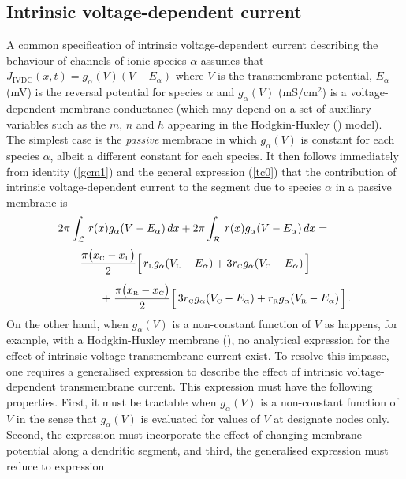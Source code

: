 \subsection{Intrinsic voltage-dependent current}
A common specification of intrinsic voltage-dependent current
describing the behaviour of channels of ionic species $\alpha$
assumes that $J_\mathrm{IVDC}(x,t)=g_\alpha(V)(V-E_\alpha)$ where
$V$ is the transmembrane potential, $E_\alpha$ (mV) is the
reversal potential for species $\alpha$ and $g_\alpha(V)$
(mS/cm$^2$) is a voltage-dependent membrane conductance (which may
depend on a set of auxiliary variables such as the $m$, $n$ and
$h$ appearing in the Hodgkin-Huxley (\cite{Hodgkin52}) model). The
simplest case is the \emph{passive} membrane in which
$g_\alpha(V)$ is constant for each species $\alpha$, albeit a
different constant for each species. It then follows immediately
from identity (\ref{gcm1}) and the general expression (\ref{tc0})
that the contribution of intrinsic voltage-dependent current to
the segment due to species $\alpha$ in a passive membrane is
\begin{equation}\label{gcm3}
\begin{array}{l}
\displaystyle2\pi\int_\mathcal{L}\, r(x) g_\alpha(V-E_\alpha)\,dx
+2\pi\int_\mathcal{R}\, r(x) g_\alpha(V-E_\alpha)\,dx = \\[12pt]
\qquad\displaystyle\frac{\pi\big(x_{\mbox{\tiny C}}-x_{\mbox{\tiny L}}\big)}{2}
\Big[\,r_{\mbox{\tiny L}} g_\alpha(V_{\mbox{\tiny L}}-E_\alpha)
+3r_{\mbox{\tiny C}} g_\alpha(V_{\mbox{\tiny C}}-E_\alpha)\,\Big]\\[12pt]
\qquad\qquad\displaystyle+\;\frac{\pi\big(x_{\mbox{\tiny R}}-x_{\mbox{\tiny C}}\big)}{2}
\Big[\,3r_{\mbox{\tiny C}} g_\alpha(V_{\mbox{\tiny C}}-E_\alpha)
+r_{\mbox{\tiny R}} g_\alpha(V_{\mbox{\tiny R}}-E_\alpha)\,\Big]\,.
\end{array}
\end{equation}
On the other hand, when $g_\alpha(V)$ is a non-constant function
of $V$ as happens, for example, with a Hodgkin-Huxley membrane
(\cite{Hodgkin52}), no analytical expression for the effect of
intrinsic voltage transmembrane current exist. To resolve this
impasse, one requires a generalised expression to describe the
effect of intrinsic voltage-dependent transmembrane current. This
expression must have the following properties. First, it must be
tractable when $g_\alpha(V)$ is a non-constant function of $V$ in
the sense that $g_\alpha(V)$ is evaluated for values of $V$ at
designate nodes only. Second, the expression must incorporate the
effect of changing membrane potential along a dendritic segment,
and third, the generalised expression must reduce to expression
